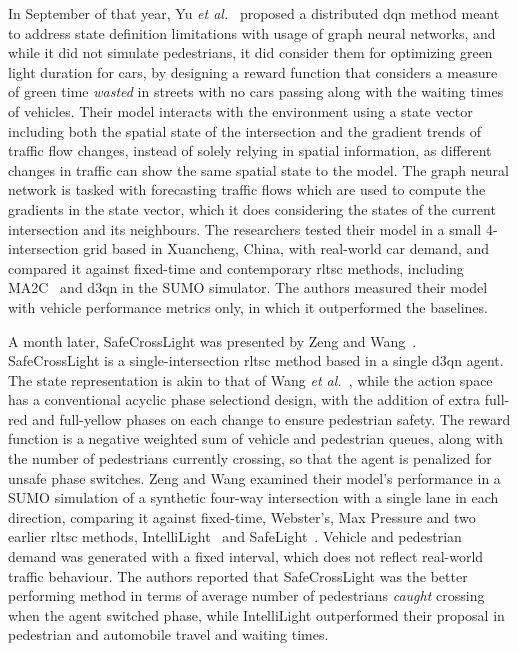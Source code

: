 In September of that year, Yu \textit{et al.}~\cite{Fuhao2025} proposed a distributed \gls{dqn} method meant to address state definition limitations with usage of graph neural networks, and while it did not simulate pedestrians, it did consider them for optimizing green light duration for cars, by designing a reward function that considers a measure of green time \textit{wasted} in streets with no cars passing along with the waiting times of vehicles.
Their model interacts with the environment using a state vector including both the spatial state of the intersection and the gradient trends of traffic flow changes, instead of solely relying in spatial information, as different changes in traffic can show the same spatial state to the model. The graph neural network is tasked with forecasting traffic flows which are used to compute the gradients in the state vector, which it does considering the states of the current intersection and its neighbours. The researchers tested their model in a small 4-intersection grid based in Xuancheng, China, with real-world car demand, and compared it against fixed-time and contemporary \gls{rltsc} methods, including MA2C~\cite{Chu2019} and \gls{d3qn} in the SUMO simulator. The authors measured their model with vehicle performance metrics only, in which it outperformed the baselines.

A month later, SafeCrossLight was presented by Zeng and Wang~\cite{Zeng2025}. SafeCrossLight is a single-intersection \gls{rltsc} method based in a single \gls{d3qn} agent. The state representation is akin to that of Wang \textit{et al.}~\cite{Wang2025}, while the action space has a conventional acyclic phase selectiond design, with the addition of extra full-red and full-yellow phases on each change to ensure pedestrian safety. The reward function is a negative weighted sum of vehicle and pedestrian queues, along with the number of pedestrians currently crossing, so that the agent is penalized for unsafe phase switches. Zeng and Wang examined their model's performance in a SUMO simulation of a synthetic four-way intersection with a single lane in each direction, comparing it against fixed-time, Webster's, Max Pressure and two earlier \gls{rltsc} methods, IntelliLight~\cite{Wei2018} and SafeLight~\cite{Du2023}. Vehicle and pedestrian demand was generated with a fixed interval, which does not reflect real-world traffic behaviour. The authors reported that SafeCrossLight was the better performing method in terms of average number of pedestrians \textit{caught} crossing when the agent switched phase, while IntelliLight outperformed their proposal in pedestrian and automobile travel and waiting times.

